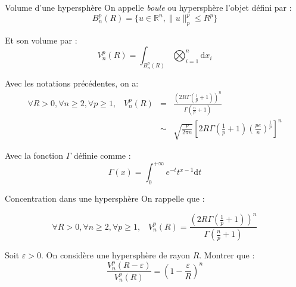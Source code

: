\documentclass{beamer}
\begin{document}
\begin{frame}{}{Volume d'une hypersphère}
	On appelle \textit{boule} ou hypersphère l'objet défini par :
	\begin{equation*} 
		B_n^p(R) = \{ u \in \mathbb{R}^n, \|u\|_p^p \leqslant R^p\}
	\end{equation*}
	
	Et son volume par :
	\begin{equation*} V_n^p(R) = \int_{B_n^p(R)} \bigotimes_{i=1}^n\mathrm{d}x_i \end{equation*}
	
	\begin{proposition} Avec les notations précédentes, on a:
		\begin{eqnarray*} 
			\forall R>0, \forall n\geqslant 2, \forall p\geqslant 1, \; \; \; V_n^p(R) &=& \frac{\left(2R\Gamma\left(\frac{1}{p}+1\right)\right)^n}{\Gamma\left(\frac{n}{p}+1\right)} \\
			&\sim& \sqrt{\frac{p}{2\pi n}} \left[2R\Gamma\left(\frac{1}{p}+1\right) \left(\frac{pe}{n}\right)^{\frac{1}{p}}\right]^n 
		\end{eqnarray*}
	
		Avec la fonction $\Gamma$ définie comme :
		\begin{equation*} \Gamma(x) = \int_0^{+\infty} e^{-t}t^{x-1}\mathrm{d}t \end{equation*}
	\end{proposition}
\end{frame}



\begin{frame}{}{Concentration dans une hypersphère}
	On rappelle que :
	
	\begin{equation*}
		\forall R>0, \forall n\geqslant 2, \forall p\geqslant 1, \; \; \; V_n^p(R) = \frac{\left(2R\Gamma\left(\frac{1}{p}+1\right)\right)^n}{\Gamma\left(\frac{n}{p}+1\right)} 
	\end{equation*}
	
	\begin{exercice}
		Soit $\varepsilon > 0$. On considère une hypersphère de rayon $R$. Montrer que :
			\begin{equation*} 
				\frac{V_n^p(R - \varepsilon)}{V_n^p(R)} = \left(1- \frac{\varepsilon}{R}\right)^n 
			\end{equation*}
	\end{exercice}
\end{frame}
\end{document}

